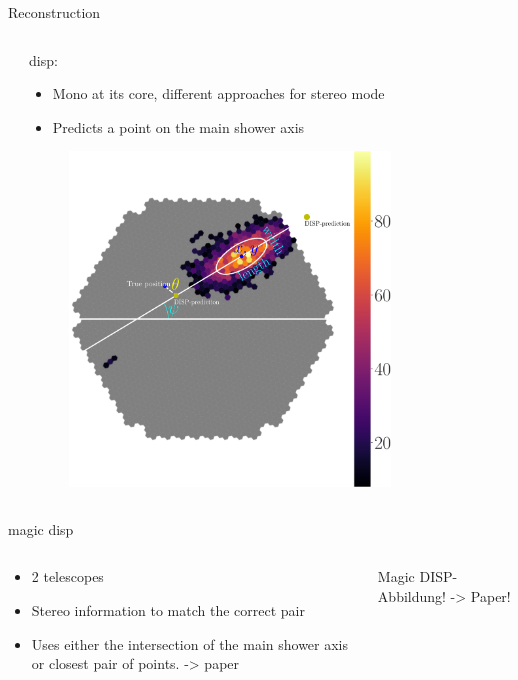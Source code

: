 \documentclass[aspectratio=1610, 9pt]{beamer}
\begin{document}
\begin{frame}{Reconstruction}
\begin{columns}[T]
\begin{column}{.45\textwidth}
    \end{column}
    \begin{column}{.45\textwidth}
      disp:
      \begin{itemize}
        \item Mono at its core, different approaches for stereo mode
        \item Predicts a point on the main shower axis
      \end{itemize}
      \begin{figure}
        \centering
        \includegraphics[width=0.8\textwidth]{../thesis/Plots/hillas_complete.pdf}
      \end{figure}
    \end{column} 
  \end{columns}
\end{frame}

\begin{frame}{magic disp}
  \begin{columns}[T]
    \begin{column}{.45\textwidth}
      \begin{itemize}
        \item 2 telescopes
        \item Stereo information to match the correct pair
        \item Uses either the intersection of the main shower axis or closest pair of points. -> paper 
      \end{itemize}
    \end{column}
    \begin{column}{.45\textwidth}
      Magic DISP-Abbildung! -> Paper!
    \end{column} 
  \end{columns}
\end{frame}
\end{document}
